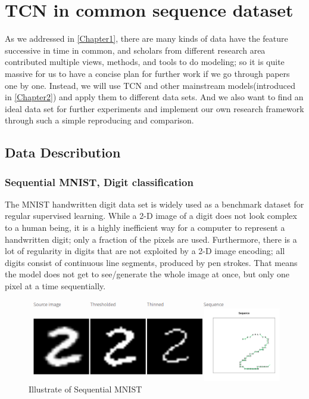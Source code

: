 
\chapter{TCN in common sequence dataset} %

\label{Chapter3} %


As we addressed in \ref{Chapter1}, there are many kinds of data have the feature successive in time in common, and scholars from different research area contributed multiple views, methods, and tools to do modeling; so it is quite massive for us to have a concise plan for further work if we go through papers one by one. Instead, we will use TCN and other mainstream models(introduced in \ref{Chapter2}) and apply them to different data sets. And we also want to find an ideal data set for further experiments and implement our own research framework through such a simple reproducing and comparison. 

\section{Data Describution}

\subsection{Sequential MNIST, Digit classification}
The MNIST handwritten digit data set is widely used as a benchmark dataset for regular supervised learning. While a 2-D image of a digit does not look complex to a human being, it is a highly inefficient way for a computer to represent a handwritten digit; only a fraction of the pixels are used. Furthermore, there is a lot of regularity in digits that are not exploited by a 2-D image encoding; all digits consist of continuous line segments, produced by pen strokes. That means the model does not get to see/generate the whole image at once, but only one pixel at a time sequentially. 
\begin{figure}[H]
    \includegraphics[width=\textwidth]{../Figures/seqMNIST.png}
    \caption{Illustrate of Sequential MNIST}
    \label{fig:MNIST}
\end{figure}
